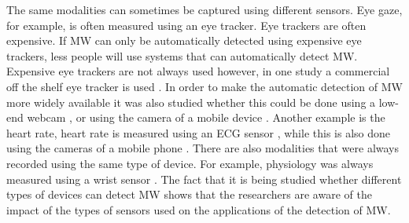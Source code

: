 The same modalities can sometimes be captured using different sensors. Eye gaze, for example, is often measured using an eye tracker. Eye trackers are often expensive. If MW can only be automatically detected using expensive eye trackers, less people will use systems that can automatically detect MW. Expensive eye trackers are not always used however, in one study a commercial off the shelf eye tracker is used \cite{Hutt2017OutClassroom}. In order to make the automatic detection of MW more widely available it was also studied whether this could be done using a low-end webcam \cite{Stewart2016WheresViewing}\cite{Stewart2017FaceComprehension}\cite{Zhao2017ScalableApproach}, or using the camera of a mobile device \cite{ISI:000443429900018}. Another example is the heart rate, heart rate is measured using an ECG sensor \cite{Gontier2016HowEnvironment}, while this is also done using the cameras of a mobile phone \cite{Pham2015Attentivelearner:Tracking}. There are also modalities that were always recorded using the same type of device. For example, physiology was always measured using a wrist sensor \cite{Bixler2015AutomaticPhysiology}\cite{Blanchard2014AutomatedLearning}. The fact that it is being studied whether different types of devices can detect MW shows that the researchers are aware of the impact of the types of sensors used on the applications of the detection of MW.